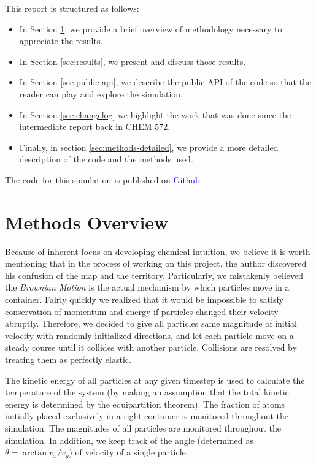 \documentclass[10pt]{article}
\begin{document}
This report is structured as follows:\vspace{-1em}
\begin{itemize}
    \itemsep-0.2em
    \item In Section \ref{sec:methods-brief}, we provide a brief overview of methodology necessary to appreciate the results.
    \item In Section \ref{sec:results}, we present and discuss those results.
    \item In Section \ref{sec:public-api}, we describe the public API of the code so that the reader can play and explore the simulation.
    \item In Section \ref{sec:changelog} we highlight the work that was done since the intermediate report back in CHEM 572.
    \item Finally, in section \ref{sec:methods-detailed}, we provide a more detailed description of the code and the methods used.
\end{itemize}

The code for this simulation is published on \href{https://github.com/anmorgunov/statmech-simulation}{\textcolor{blue}{Github}}. 

\section{Methods Overview}
\label{sec:methods-brief}
Because of inherent focus on developing chemical intuition, we believe it is worth mentioning that in the process of working on this project, the author discovered his confusion of the map and the territory. Particularly, we mistakenly believed the \textit{Brownian Motion} is the actual mechanism by which particles move in a container. Fairly quickly we realized that it would be impossible to satisfy conservation of momentum and energy if particles changed their velocity abruptly. Therefore, we decided to give all particles same magnitude of initial velocity with randomly initialized directions, and let each particle move on a steady course until it collides with another particle. Collisions are resolved by treating them as perfectly elastic. 

The kinetic energy of all particles at any given timestep is used to calculate the temperature of the system (by making an assumption that the total kinetic energy is determined by the equipartition theorem). The fraction of atoms initially placed exclusively in a right container is monitored throughout the simulation. The magnitudes of all particles are monitored throughout the simulation. In addition, we keep track of the angle (determined as $\theta = \arctan v_x/v_y$) of velocity of a single particle.
\end{document}
